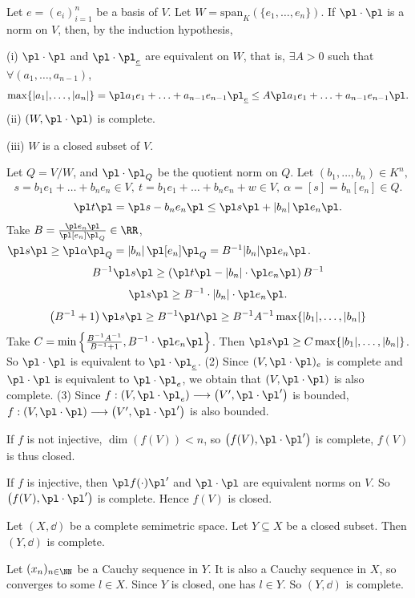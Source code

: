 \begin{proofenv}
    \quad Let $e=(e_i)_{i=1}^n$ be a basis of $V$. Let $W=\mathrm{span}_K\left(\{e_1,\ldots,e_n\}\right)$. If $\pl\cdot\pl$ is a norm on $V$, then, by the induction hypothesis,
    
    (i) $\pl\cdot\pl$ and $\pl\cdot\pl_{\underline{e}}$ are equivalent on $W$, that is, $\exists A>0$ such that $\forall(a_1,\ldots,a_{n-1})$, 
    $$\max\{|a_1|,\ldots,|a_n|\}=\pl a_1e_1+\ldots+a_{n-1}e_{n-1}\pl_{\underline{e}}\le A\pl a_1e_1+\ldots+a_{n-1}e_{n-1}\pl.$$ 
    (ii) $(W,\pl\cdot\pl)$ is complete.

    (iii) $W$ is a closed subset of $V$.

    Let $Q=V/W$, and $\pl\cdot\pl_Q$ be the quotient norm on $Q$. Let $(b_1,\ldots,b_n)\in K^n,$
    $$s=b_1e_1+\ldots+b_ne_n\in V,\ t=b_1e_1+\ldots+b_ne_n+w\in V,\ \alpha=[s]=b_n[e_n]\in Q.$$
    $$\pl t\pl =\pl s-b_ne_n\pl\le \pl s\pl+\left|b_n\right|\pl e_n\pl.$$
    Take $B=\frac{\pl e_n\pl}{\pl[e_n]\pl_Q}\in \RR$, $\pl s\pl\ge\pl\alpha\pl_Q=\left|b_n\right|\pl[e_n]\pl_Q=B^{-1}|b_n|\pl e_n\pl$.
    $$B^{-1}\pl s\pl\ge\left(\pl t\pl-|b_n|\cdot\pl e_n\pl\right)B^{-1}$$
    $$\pl s\pl \ge B^{-1}\cdot|b_n|\cdot\pl e_n\pl.$$
    $$\left(B^{-1}+1\right)\pl s\pl \ge B^{-1}\pl t\pl\ge B^{-1}A^{-1}\max\{|b_1|,\ldots,|b_n|\}$$
    Take $C=\min\left\{\frac{B^{-1}A^{-1}}{B^{-1}+1},B^{-1}\cdot\pl e_n\pl\right\}$. Then $\pl s\pl\ge C\max\{|b_1|,\ldots,|b_n|\}$. So $\pl\cdot\pl$ is equivalent to $\pl\cdot\pl_{\underline{e}}$.
    \newline
    (2) Since $(V,\pl\cdot\pl)_e$ is complete and $\pl\cdot\pl$ is equivalent to $\pl\cdot\pl_e$, we obtain that $(V,\pl\cdot\pl)$ is also complete.
    \newline
    (3) Since $f:\left(V,\pl\cdot\pl_e\right)\longrightarrow \left(V',\pl\cdot\pl'\right)$ is bounded, $f:\left(V,\pl\cdot\pl\right)\longrightarrow \left(V',\pl\cdot\pl'\right)$ is also bounded. 
    
    \quad If $f$ is not injective, $\dim\left(f(V)\right)<n$, so $\left(f(V),\pl\cdot\pl'\right)$ is complete, $f(V)$ is thus closed.

    \quad If $f$ is injective, then $\pl f(\cdot)\pl'$ and $\pl\cdot\pl$ are equivalent norms on $V$. So $\left(f(V),\pl\cdot\pl'\right)$ is complete. Hence $f(V)$ is closed.
    
\end{proofenv}
\begin{propositionenv}
    Let $(X,\dd)$ be a complete semimetric space. Let $Y\subseteq X$ be a closed subset. Then $(Y,\dd)$ is complete.
\end{propositionenv}
\begin{proofenv}
    Let $(x_n)_{n\in\NN}$ be a Cauchy sequence in $Y$. It is also a Cauchy sequence in $X$, so converges to some $l\in X$. Since $Y$ is closed, one has $l\in Y$. So $(Y,\dd)$ is complete.
\end{proofenv}


